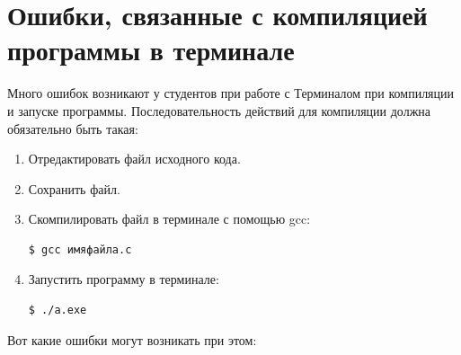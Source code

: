 \documentclass{article}
\begin{document}
\section*{Ошибки, связанные с компиляцией программы в терминале}
Много ошибок возникают у студентов при работе с Терминалом при компиляции и запуске программы. Последовательность действий для компиляции должна обязательно быть такая:
\begin{enumerate}
\item Отредактировать файл исходного кода.
\item Сохранить файл.
\item Скомпилировать файл в терминале с помощью gcc:
\begin{lstlisting}[style=csMiptBash]
$ gcc имяфайла.c
\end{lstlisting}
\item Запустить программу в терминале:
\begin{lstlisting}[style=csMiptBash]
$ ./a.exe
\end{lstlisting}
\end{enumerate}
Вот какие ошибки могут возникать при этом:
\end{document}
